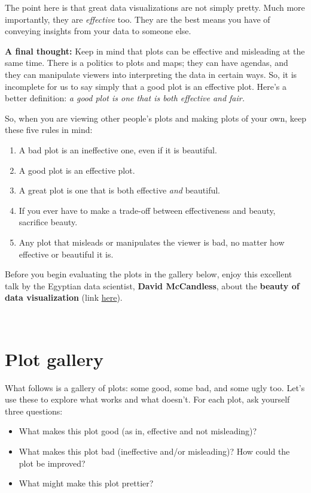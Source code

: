 \documentclass[
]{book}
\begin{document}
The point here is that great data visualizations are not simply pretty. Much more importantly, they are \emph{effective} too. They are the best means you have of conveying insights from your data to someone else.

\textbf{A final thought:} Keep in mind that plots can be effective and misleading at the same time. There is a politics to plots and maps; they can have agendas, and they can manipulate viewers into interpreting the data in certain ways. So, it is incomplete for us to say simply that a good plot is an effective plot. Here's a better definition: \emph{a good plot is one that is both effective and fair.}

So, when you are viewing other people's plots and making plots of your own, keep these five rules in mind:

\begin{enumerate}
\def\labelenumi{\arabic{enumi}.}
\item
  A bad plot is an ineffective one, even if it is beautiful.
\item
  A good plot is an effective plot.
\item
  A great plot is one that is both effective \emph{and} beautiful.
\item
  If you ever have to make a trade-off between effectiveness and beauty, sacrifice beauty.
\item
  Any plot that misleads or manipulates the viewer is bad, no matter how effective or beautiful it is.
\end{enumerate}

Before you begin evaluating the plots in the gallery below, enjoy this excellent talk by the Egyptian data scientist, \textbf{David McCandless}, about the \textbf{beauty of data visualization} (link \href{https://www.youtube.com/watch?v=5Zg-C8AAIGg}{here}).

~

\hypertarget{plot-gallery}{%
\section*{Plot gallery}\label{plot-gallery}}

What follows is a gallery of plots: some good, some bad, and some ugly too. Let's use these to explore what works and what doesn't. For each plot, ask yourself three questions:

\begin{itemize}
\item
  What makes this plot good (as in, effective and not misleading)?
\item
  What makes this plot bad (ineffective and/or misleading)? How could the plot be improved?
\item
  What might make this plot prettier?
\end{itemize}
\end{document}
